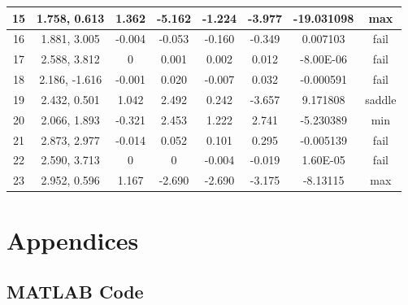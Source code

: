 \documentclass[12pt,onecolumn]{article}
\begin{document}
\begin{table}[H]
\begin{tabular}{|c|c|c|c|c|c|c|c|}
15       & 1.758, 0.613   & 1.362    & -5.162  & -1.224 & -3.977 & -19.031098     & max           \\ \hline
16       & 1.881, 3.005   & -0.004   & -0.053  & -0.160 & -0.349 & 0.007103       & fail          \\ \hline
17       & 2.588, 3.812   & 0        & 0.001   & 0.002  & 0.012  & -8.00E-06      & fail          \\ \hline
18       & 2.186, -1.616  & -0.001   & 0.020   & -0.007 & 0.032  & -0.000591      & fail          \\ \hline
19       & 2.432, 0.501   & 1.042    & 2.492   & 0.242  & -3.657 & 9.171808       & saddle        \\ \hline
20       & 2.066, 1.893   & -0.321   & 2.453   & 1.222  & 2.741  & -5.230389      & min           \\ \hline
21       & 2.873, 2.977   & -0.014   & 0.052   & 0.101  & 0.295  & -0.005139      & fail          \\ \hline
22       & 2.590, 3.713   & 0        & 0       & -0.004 & -0.019 & 1.60E-05       & fail          \\ \hline
23       & 2.952, 0.596   & 1.167    & -2.690  & -2.690 & -3.175 & -8.13115       & max           \\ \hline
\end{tabular}
\end{table}
\newpage
\section{Appendices}

\subsection{MATLAB Code}
\end{document}
